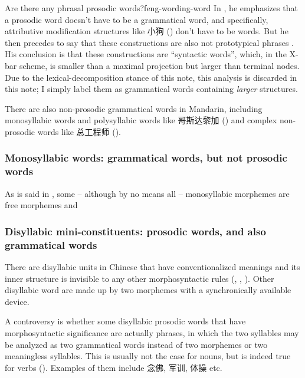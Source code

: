 \documentclass[UTF8, a4paper, oneside, scheme=plain, 12pt]{ctexrep}
\newcommand*{\citepages}[1]{pp.~{#1}}
\begin{document}
\begin{infobox}{Are there any phrasal prosodic words?}{feng-wording-word}
    In \citet[\citepages{84-85}]{feng2000}, he emphasizes that 
    a prosodic word doesn't have to be a grammatical word,
    and specifically, attributive modification structures like 小狗 
    ()
    don't have to be words.
    But he then precedes to say 
    that these constructions are also not prototypical phrases
    \citep[\citepages{85-86}]{feng2000}.
    His conclusion is that these constructions 
    are ``syntactic words'',
    which, in the X-bar scheme, 
    is smaller than a maximal projection but larger than terminal nodes.
    Due to the lexical-decomposition stance of this note,
    this analysis is discarded in this note;
    I simply label them as grammatical words
    containing \emph{larger} structures.
\end{infobox}

There are also non-prosodic grammatical words in Mandarin,
including monosyllabic words and polysyllabic words like 哥斯达黎加 
()
and complex non-prosodic words like 
总工程师 ().


\subsubsection{Monosyllabic words: grammatical words, but not prosodic words}\label{sec:pos.word.monosyllabic}

As is said in , 
some -- although by no means all -- monosyllabic morphemes 
are free morphemes and

\subsubsection{Disyllabic mini-constituents: prosodic words, and also grammatical words}\label{sec:pos.architecture.word.mini-constituent}

There are disyllabic units in Chinese 
that have conventionalized meanings and its inner structure is invisible 
to any other morphosyntactic rules 
(,
,
).
Other disyllabic word are made up by two morphemes with a synchronically available device.

A controversy is whether some disyllabic prosodic words that have morphosyntactic significance
are actually phrases,
in which the two syllables may be analyzed 
as two grammatical words
instead of two morphemes or two meaningless syllables.
This is usually not the case for nouns, 
but is indeed true for verbs
().
Examples of them include 念佛, 军训, 体操 etc. 
\end{document}
